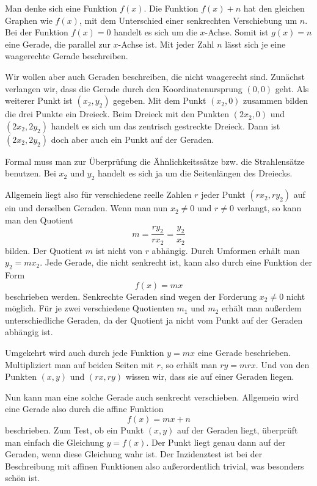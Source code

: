 \documentclass[a4paper,11pt,fleqn,twocolumn,twoside,dvipdfmx]{scrartcl}
\begin{document}
Man denke sich eine Funktion $f(x)$. Die Funktion $f(x)+n$ hat
den gleichen Graphen wie $f(x)$, mit dem Unterschied einer
senkrechten Verschiebung um $n$. Bei der Funktion $f(x)=0$
handelt es sich um die $x$-Achse. Somit ist $g(x)=n$ eine
Gerade, die parallel zur $x$-Achse ist. Mit jeder Zahl $n$ lässt
sich je eine waagerechte Gerade beschreiben.

Wir wollen aber auch Geraden beschreiben, die nicht waagerecht sind.
Zunächst verlangen wir, dass die Gerade durch den Koordinatenursprung $(0,0)$
geht. Als weiterer Punkt ist $(x_2,y_2)$ gegeben. Mit dem Punkt
$(x_2,0)$ zusammen bilden die drei Punkte ein Dreieck. Beim Dreieck
mit den Punkten $(2x_2,0)$ und $(2x_2,2y_2)$ handelt es sich
um das zentrisch gestreckte Dreieck. Dann ist $(2x_2,2y_2)$ doch
aber auch ein Punkt auf der Geraden.

Formal muss man zur Überprüfung die Ähnlichkeitssätze bzw. die
Strahlensätze benutzen. Bei $x_2$ und $y_2$ handelt es sich ja
um die Seitenlängen des Dreiecks.

Allgemein liegt also für verschiedene reelle Zahlen $r$
jeder Punkt $(rx_2,ry_2)$ auf ein und derselben Geraden.
Wenn man nun $x_2\ne 0$ und $r\ne 0$ verlangt, so kann man
den Quotient
\begin{equation}
m = \frac{ry_2}{rx_2} = \frac{y_2}{x_2}
\end{equation}
bilden. Der Quotient $m$ ist nicht von $r$ abhängig.
Durch Umformen erhält man $y_2=mx_2$. Jede Gerade, die nicht
senkrecht ist, kann also durch eine Funktion der Form
\begin{equation}
f(x)=mx
\end{equation}
beschrieben werden. Senkrechte Geraden sind wegen der Forderung
$x_2\ne 0$ nicht möglich. Für je zwei verschiedene Quotienten
$m_1$ und $m_2$ erhält man außerdem unterschiedliche Geraden,
da der Quotient ja nicht vom Punkt auf der Geraden abhängig ist.

Umgekehrt wird auch durch jede
Funktion $y=mx$ eine Gerade beschrieben. Multipliziert man auf
beiden Seiten mit $r$, so erhält man $ry=mrx$. Und von den Punkten
$(x,y)$ und $(rx,ry)$ wissen wir, dass sie auf einer Geraden liegen.

Nun kann man eine solche Gerade auch senkrecht verschieben. Allgemein
wird eine Gerade also durch die affine Funktion
\begin{equation}
f(x) = mx+n
\end{equation}
beschrieben. Zum Test, ob ein Punkt $(x,y)$ auf der Geraden liegt,
überprüft man einfach die Gleichung $y=f(x)$. Der Punkt liegt
genau dann auf der Geraden, wenn diese Gleichung wahr ist. Der
Inzidenztest ist bei der Beschreibung mit affinen Funktionen also
außerordentlich trivial, was besonders schön ist.
\end{document}
